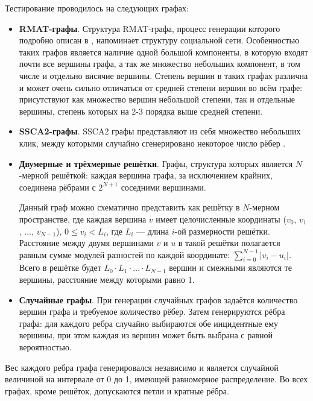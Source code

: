\documentclass[a4paper,10pt]{extarticle}
\begin{document}
Тестирование проводилось на следующих графах:
\begin{itemize}
    \item \textbf{RMAT-графы}. Структура RMAT-графа, процесс генерации которого подробно описан в \cite{rmat-graph}, напоминает структуру социальной сети. Особенностью таких графов является наличие одной большой компоненты, в которую входят почти все вершины графа, а так же множество небольших компонент, в том числе и отдельно висячие вершины. Степень вершин в таких графах различна и может очень сильно отличаться от средней степени вершин во всём графе: присутствуют как множество вершин небольшой степени, так и отдельные вершины, степень которых на 2-3 порядка выше средней степени.
    
    \item \textbf{SSCA2-графы}. SSCA2 графы представляют из себя множество небольших клик, между которыми случайно сгенерировано некоторое число рёбер \cite{ssca2-graph}.
    
    \item \textbf{Двумерные и трёхмерные решётки}. Графы, структура которых является $N$-мерной решёткой: каждая вершина графа, за исключением крайних, соединена рёбрами с $2^{N+1}$ соседними вершинами.
    
    Данный граф можно схематично представить как решётку в $N$-мерном пространстве, где каждая вершина $v$ имеет целочисленные координаты ($v_0$, $v_1$, $\ldots$, $v_{N-1}$), $0 \leq v_i < L_i$, где $L_i$ --- длина $i$-ой размерности решётки. Расстояние между двумя вершинами $v$ и $u$ в такой решётки полагается равным сумме модулей разностей по каждой координате: $\displaystyle \sum_{i=0}^{N-1} |v_i - u_i|$. 
    Всего в решётке будет $L_0 \cdot L_1 \cdot \ldots \cdot L_{N-1}$ вершин и смежными являются те вершины, расстояние между которыми равно 1.
    
    \item \textbf{Случайные графы}. 
        При генерации случайных графов задаётся количество вершин графа и требуемое количество рёбер. Затем генерируются рёбра графа: для каждого ребра случайно выбираются обе инцидентные ему вершины, при этом каждая из вершин может быть выбрана с равной вероятностью.
\end{itemize}

Вес каждого ребра графа генерировался независимо и является случайной величиной на интервале от 0 до 1, имеющей равномерное распределение. Во всех графах, кроме решёток, допускаются петли и кратные рёбра.
\end{document}
